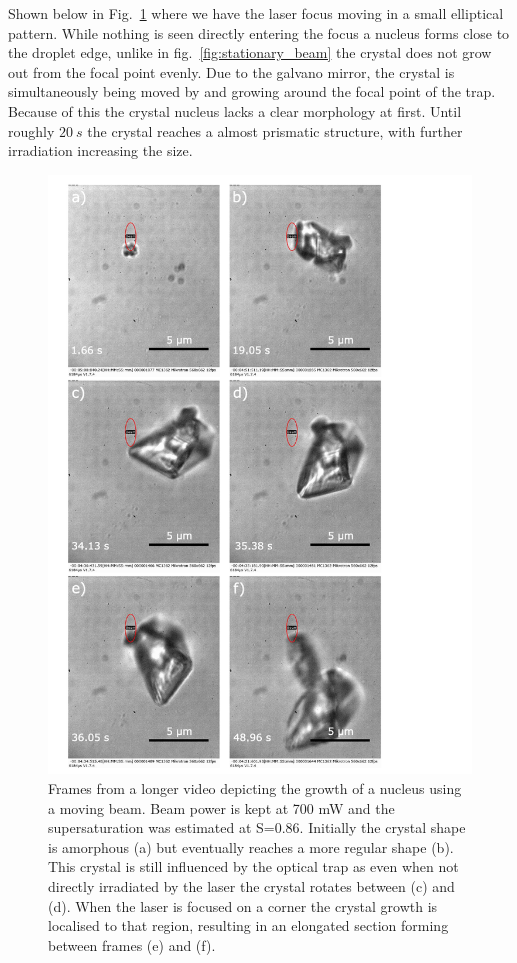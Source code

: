 Shown below in Fig.~\ref{fig:eliptical_beam_1} where 
we have the laser focus moving in a small elliptical 
pattern. While nothing is seen directly entering the 
focus a nucleus forms close to the droplet edge, 
unlike in fig.~\ref{fig:stationary_beam} the crystal 
does not grow out from the focal point evenly. Due to 
the galvano mirror, the crystal is simultaneously 
being moved by and growing around the focal point of 
the trap. Because of this the crystal nucleus lacks 
a clear morphology at first. Until roughly $20\ s$ 
the crystal reaches a almost prismatic structure, 
with further irradiation increasing the size.
\begin{figure}[h!]
	\centering
	\includegraphics[width=0.8\linewidth]{frames_eliptical_beam.pdf}
	\caption{Frames from a longer video depicting the growth 
		of a nucleus using a moving beam. Beam power is kept 
		at 700 mW and the supersaturation was estimated at 
		S=0.86. Initially the crystal shape is amorphous (a) 
		but eventually reaches a more regular shape (b). This crystal is still influenced by the optical trap as 
		even when not directly irradiated by the laser the 
		crystal rotates between (c) and (d). When the laser 
		is focused on a corner the crystal growth is localised 
		to that region, resulting in an elongated section 
		forming between frames (e) and (f).}
	\label{fig:eliptical_beam_1}
\end{figure} 

